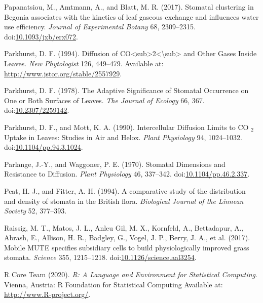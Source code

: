 \documentclass[utf8]{frontiersSCNS}
\begin{document}
\leavevmode\hypertarget{ref-papanatsiou_stomatal_2017}{}%
Papanatsiou, M., Amtmann, A., and Blatt, M. R. (2017). Stomatal
clustering in Begonia associates with the kinetics of leaf gaseous
exchange and influences water use efficiency. \emph{Journal of
Experimental Botany} 68, 2309--2315.
doi:\href{https://doi.org/10.1093/jxb/erx072}{10.1093/jxb/erx072}.

\leavevmode\hypertarget{ref-parkhurst_diffusion_1994}{}%
Parkhurst, D. F. (1994). Diffusion of
CO\textless sub\textgreater2\textless\textbackslash sub\textgreater{}
and Other Gases Inside Leaves. \emph{New Phytologist} 126, 449--479.
Available at: \url{http://www.jstor.org/stable/2557929}.

\leavevmode\hypertarget{ref-parkhurst_adaptive_1978}{}%
Parkhurst, D. F. (1978). The Adaptive Significance of Stomatal
Occurrence on One or Both Surfaces of Leaves. \emph{The Journal of
Ecology} 66, 367.
doi:\href{https://doi.org/10.2307/2259142}{10.2307/2259142}.

\leavevmode\hypertarget{ref-parkhurst_intercellular_1990}{}%
Parkhurst, D. F., and Mott, K. A. (1990). Intercellular Diffusion Limits
to CO \(_{\textrm{2}}\) Uptake in Leaves: Studies in Air and Helox.
\emph{Plant Physiology} 94, 1024--1032.
doi:\href{https://doi.org/10.1104/pp.94.3.1024}{10.1104/pp.94.3.1024}.

\leavevmode\hypertarget{ref-parlange_stomatal_1970}{}%
Parlange, J.-Y., and Waggoner, P. E. (1970). Stomatal Dimensions and
Resistance to Diffusion. \emph{Plant Physiology} 46, 337--342.
doi:\href{https://doi.org/10.1104/pp.46.2.337}{10.1104/pp.46.2.337}.

\leavevmode\hypertarget{ref-peat_comparative_1994}{}%
Peat, H. J., and Fitter, A. H. (1994). A comparative study of the
distribution and density of stomata in the British flora.
\emph{Biological Journal of the Linnean Society} 52, 377--393.

\leavevmode\hypertarget{ref-raissig_mobile_2017}{}%
Raissig, M. T., Matos, J. L., Anleu Gil, M. X., Kornfeld, A.,
Bettadapur, A., Abrash, E., Allison, H. R., Badgley, G., Vogel, J. P.,
Berry, J. A., et al. (2017). Mobile MUTE specifies subsidiary cells to
build physiologically improved grass stomata. \emph{Science} 355,
1215--1218.
doi:\href{https://doi.org/10.1126/science.aal3254}{10.1126/science.aal3254}.

\leavevmode\hypertarget{ref-r_core_team_r:_2020}{}%
R Core Team (2020). \emph{R: A Language and Environment for Statistical
Computing}. Vienna, Austria: R Foundation for Statistical Computing
Available at: \url{http://www.R-project.org/}.
\end{document}
